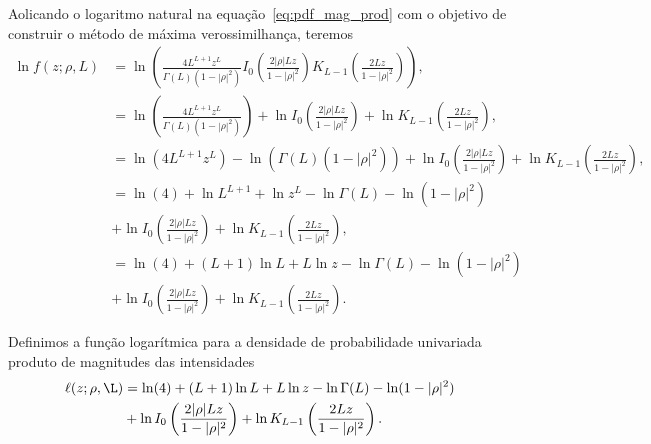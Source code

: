 
Aolicando  o logaritmo natural na equação~\eqref{eq:pdf_mag_prod} com o objetivo de construir o método de máxima verossimilhança, teremos
\begin{equation}\nonumber
\begin{split}
	\ln f(z;\rho,L)&=\ln\left(\frac{4L^{L+1}z^L}{\Gamma(L)(1-|\rho|^2)}I_0\left(\frac{2|\rho|Lz}{1-|\rho|^2}\right)K_{L-1}\left(\frac{2Lz}{1-|\rho|^2}\right)\right),\\
	&=\ln\left(\frac{4L^{L+1}z^L}{\Gamma(L)(1-|\rho|^2)}\right)+\ln I_0\left(\frac{2|\rho|Lz}{1-|\rho|^2}\right)+ \ln K_{L-1}\left(\frac{2Lz}{1-|\rho|^2}\right),\\
	&=\ln (4L^{L+1}z^L)-\ln(\Gamma(L)(1-|\rho|^2))+\ln I_0\left(\frac{2|\rho|Lz}{1-|\rho|^2}\right)+ \ln K_{L-1}\left(\frac{2Lz}{1-|\rho|^2}\right),\\
     &=\ln (4)+\ln L^{L+1}+\ln z^L-\ln\Gamma(L)-\ln(1-|\rho|^2)\\
     &+\ln I_0\left(\frac{2|\rho|Lz}{1-|\rho|^2}\right)+ \ln K_{L-1}\left(\frac{2Lz}{1-|\rho|^2}\right),\\
	&=\ln (4)+(L+1)\ln L+L\ln z-\ln\Gamma(L)-\ln(1-|\rho|^2)\\
	&+\ln I_0\left(\frac{2|\rho|Lz}{1-|\rho|^2}\right)+ \ln K_{L-1}\left(\frac{2Lz}{1-|\rho|^2}\right).
		\end{split}
\end{equation}

Definimos a função logarítmica para a densidade de probabilidade univariada produto de magnitudes das intensidades
\begin{equation}\label{eq:log_vero_mag_produto}
\begin{split}
	\ell(z; \rho,\L)&=\ln (4)+(L+1)\ln L+L\ln z-\ln\Gamma(L)-\ln(1-|\rho|^2)\\
	                      &+\ln I_0\left(\frac{2|\rho|Lz}{1-|\rho|^2}\right)+ \ln K_{L-1}\left(\frac{2Lz}{1-|\rho|^2}\right).
	\end{split}
\end{equation}

